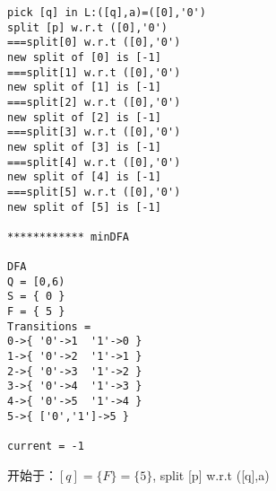 \begin{lstlisting}
pick [q] in L:([q],a)=([0],'0')
split [p] w.r.t ([0],'0')
===split[0] w.r.t ([0],'0')
new split of [0] is [-1]
===split[1] w.r.t ([0],'0')
new split of [1] is [-1]
===split[2] w.r.t ([0],'0')
new split of [2] is [-1]
===split[3] w.r.t ([0],'0')
new split of [3] is [-1]
===split[4] w.r.t ([0],'0')
new split of [4] is [-1]
===split[5] w.r.t ([0],'0')
new split of [5] is [-1]

************ minDFA

DFA
Q = [0,6)
S = { 0 }
F = { 5 }
Transitions = 
0->{ '0'->1  '1'->0 }
1->{ '0'->2  '1'->1 }
2->{ '0'->3  '1'->2 }
3->{ '0'->4  '1'->3 }
4->{ '0'->5  '1'->4 }
5->{ ['0','1']->5 }

current = -1

\end{lstlisting}

开始于：$[q]=\{F\} = \{5\}$, split [p] w.r.t ([q],a)

